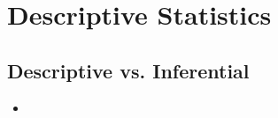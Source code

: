 \documentclass[12pt,a4paper]{article}
\begin{document}

\clearpage
\section{Descriptive Statistics}
\subsection{Descriptive vs. Inferential}
\begin{itemize}
    \item 
\end{itemize}
\end{document}
